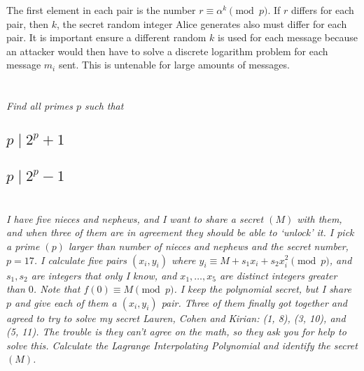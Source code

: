 \documentclass[12pt]{article}
\begin{document}
    The first element in each pair is the number $r \equiv \alpha^k \pmod{p}$. If $r$ differs for each pair, then $k$, the secret random integer Alice generates also must differ for each pair. It is important ensure a different random $k$ is used for each message because an attacker would then have to solve a discrete logarithm problem for each message $m_i$ sent. This is untenable for large amounts of messages.

\newpage

\section{} \textit{Find all primes $p$ such that}

    \subsection{$p \mid 2^p + 1$}

    \subsection{$p \mid 2^p - 1$}

\newpage

\section{} \textit{I have five nieces and nephews, and I want to share a secret $(M)$ with them, and when three of them are in agreement they should be able to `unlock' it. I pick a prime $(p)$ larger than number of nieces and nephews and the secret number, $p = 17$. I calculate five pairs $(x_i, y_i)$ where $y_i \equiv M + s_1 x_i + s_2 x_i ^ 2\pmod{p}$, and $s_1, s_2$ are integers that only I know, and $x_1, \dots, x_5$ are distinct integers greater than $0$. Note that $f(0) \equiv M \pmod{p}$. I keep the polynomial secret, but I share $p$ and give each of them a $(x_i, y_i)$ pair. Three of them finally got together and agreed to try to solve my secret Lauren, Cohen and Kirian: (1, 8), (3, 10), and (5, 11). The trouble is they can't agree on the math, so they ask you for help to solve this. Calculate the Lagrange Interpolating Polynomial and identify the secret $(M)$.}
\end{document}
